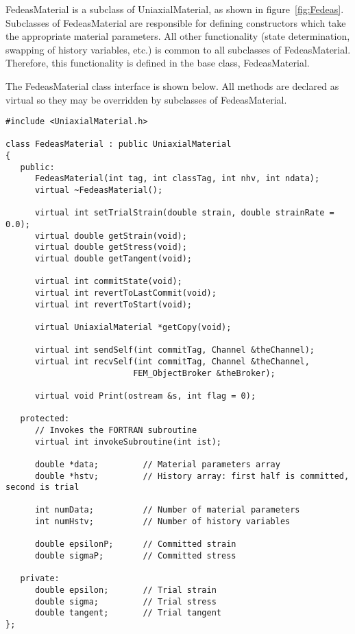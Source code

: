 \documentclass[12pt]{article}
\begin{document}
FedeasMaterial is a subclass of UniaxialMaterial, as shown in figure~\ref{fig:Fedeas}.
Subclasses of FedeasMaterial are responsible for defining constructors which take the
appropriate material parameters. All other functionality (state determination, swapping
of history variables, etc.) is common to all subclasses of FedeasMaterial. Therefore,
this functionality is defined in the base class, FedeasMaterial.

The FedeasMaterial class interface is shown below. All methods are declared as virtual
so they may be overridden by subclasses of FedeasMaterial.

{\sf\small
\begin{verbatim}
#include <UniaxialMaterial.h>

class FedeasMaterial : public UniaxialMaterial
{
   public:
      FedeasMaterial(int tag, int classTag, int nhv, int ndata);
      virtual ~FedeasMaterial();
     
      virtual int setTrialStrain(double strain, double strainRate = 0.0);
      virtual double getStrain(void);
      virtual double getStress(void);
      virtual double getTangent(void);
     
      virtual int commitState(void);
      virtual int revertToLastCommit(void);    
      virtual int revertToStart(void);        
     
      virtual UniaxialMaterial *getCopy(void);
     
      virtual int sendSelf(int commitTag, Channel &theChannel);  
      virtual int recvSelf(int commitTag, Channel &theChannel, 
                          FEM_ObjectBroker &theBroker);    
     
      virtual void Print(ostream &s, int flag = 0);
     
   protected:
      // Invokes the FORTRAN subroutine
      virtual int invokeSubroutine(int ist);
     
      double *data;         // Material parameters array
      double *hstv;         // History array: first half is committed, second is trial
     
      int numData;          // Number of material parameters
      int numHstv;          // Number of history variables
     
      double epsilonP;      // Committed strain
      double sigmaP;        // Committed stress
     
   private:
      double epsilon;       // Trial strain
      double sigma;         // Trial stress
      double tangent;       // Trial tangent
};
\end{verbatim}
}
\end{document}
